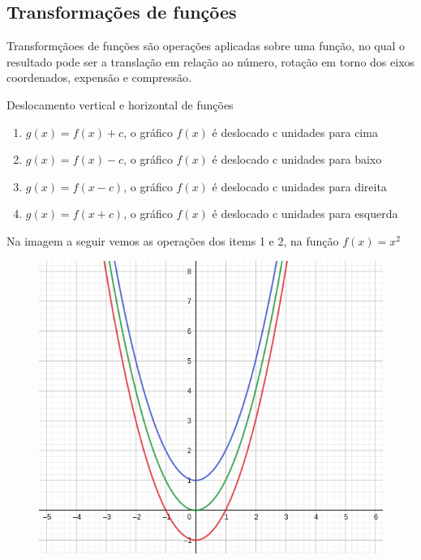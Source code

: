 \begin{multicols*}{2}
            \subsection*{Transformações de funções}
            Transformçãoes de funções são operações aplicadas sobre uma função, no qual o  resultado pode 			ser a translação em relação ao número, rotação em torno dos eixos coordenados, expensão e 				compressão.
            
            Deslocamento vertical e horizontal de funções
            \begin{enumerate}
                \item $g(x) = f(x) + c$, o gráfico $f(x)$ é deslocado c unidades para cima
                \item $g(x) = f(x) - c $, o gráfico $f(x)$ é deslocado c unidades para baixo
                \item $g(x) = f(x - c) $, o gráfico $f(x)$ é deslocado c unidades para direita
                \item $g(x) = f(x + c) $, o gráfico $f(x)$ é deslocado c unidades para esquerda
            \end{enumerate}
            Na imagem a seguir vemos as operações dos items 1 e 2, na função $f(x) = x^2$
            \begin{figure}[H]
                    \includegraphics[scale=0.4]{assets/rafael/img7.png}
            \end{figure}
            \begin{itemize}

\end{itemize}
\end{multicols*}
